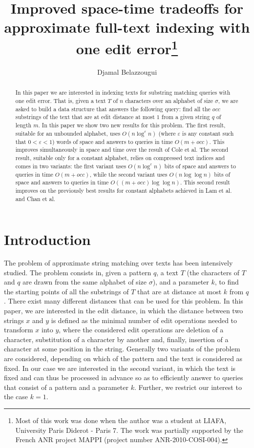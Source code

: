 \documentclass{article}
\newcommand{\?}{\mskip1.5mu}
\renewcommand{\epsilon}{\varepsilon}
\begin{document}
 
\sloppy
\title{Improved space-time tradeoffs for approximate full-text indexing with one edit error\thanks{Most of this work was done when the author was a student at LIAFA, University Paris Diderot - Paris 7. The work was partially supported by the French
 ANR project MAPPI (project number ANR-2010-COSI-004).}}
\author{Djamal Belazzougui}

\maketitle
\begin{abstract}
In this paper we are interested in indexing texts for substring matching queries with one edit error. That is, given a text $T$ of 
$n$ characters over an alphabet of size $\sigma$, we are asked to build a data structure that answers the following query:
find all the $occ$ substrings of the text that are at edit distance at most $1$ from a given string $q$ of length $m$. In this paper we show two new results for this problem. The first result, suitable for an unbounded alphabet, uses $O(n\log^\epsilon n)$ (where $\epsilon$ is any constant such that $0<\epsilon<1$) words of space and answers to queries in time $O(m+occ)$. This improves simultaneously in space and time over the result of Cole et al. The second result, suitable only for a constant alphabet, relies on compressed text indices and comes in two variants: the first variant uses $O(n\log^{\epsilon} n)$ bits of space and answers to queries in time $O(m+occ)$, while the second variant uses $O(n\log\log n)$ bits of space and answers to queries in time $O((m+occ)\log\log n)$. This second result improves on the previously best results for constant alphabets achieved in Lam et al. and Chan et al. 
\end{abstract}
\section{Introduction}
The problem of approximate string matching over texts has been intensively studied. The problem consists in, given a pattern $q$, a text $T$ (the characters of $T$ and $q$ are drawn from the same alphabet of size $\sigma$), and a parameter $k$, to find the starting points of all the substrings of $T$ that are at distance at most $k$ from $q$. There exist many different distances that can be used for this problem. In this paper, we are interested in the edit distance, in which the distance between two strings $x$ and $y$ is defined as the minimal number of edit operations needed to transform $x$ into $y$, where the considered edit operations are deletion of a character, substitution of a character by another and, finally, insertion of a character at some position in the string. Generally two variants of the problem are considered, depending on which of the pattern and the text is considered as fixed. In our case we are interested in the second variant, in which the text is fixed and can thus be processed in advance so as to efficiently answer to queries that consist of a pattern and a parameter $k$. Further, we restrict our interest to the case $k=1$. 
\end{document}
